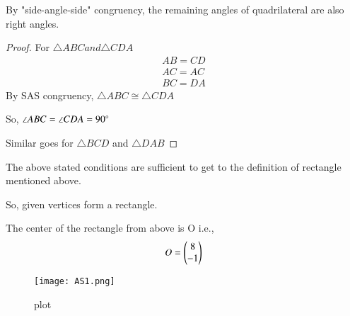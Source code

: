 \documentclass[journal,12pt,twocolumn]{IEEEtran}
\begin{document}
\begin{lemma}
By "side-angle-side" congruency, the remaining angles of quadrilateral are also right angles.
\end{lemma} 
\begin{proof}
For $\triangle ABC and \triangle CDA$
\begin{align}
    AB = CD\\
    AC = AC\\
    BC = DA
\end{align}
By SAS congruency, $\triangle ABC \cong \triangle CDA$

So, $\angle ABC = \angle CDA = 90\degree$

Similar goes for $\triangle BCD$ and $\triangle DAB$
\end{proof}
The above stated conditions are sufficient to get to the definition of rectangle mentioned above.

So, given vertices form a rectangle.

The center of the rectangle from above is O i.e.,
\begin{align}
    O = \begin{pmatrix}8\\ -1\end{pmatrix}
\end{align}

\begin{figure}[htp]
    \centering
    \texttt{[image: AS1.png]}
    \caption{plot}
    \label{fig:my_label}
\end{figure}
\end{document}
